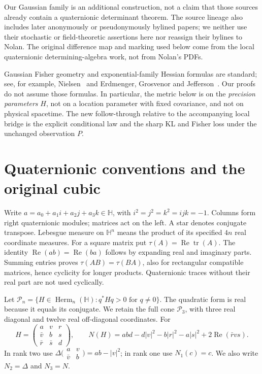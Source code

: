 \documentclass[11pt,a4paper]{article}
\numberwithin{equation}{section}
\theoremstyle{definition}
\theoremstyle{remark}
\newcommand{\HH}{\mathbb H}
\newcommand{\PP}{\mathcal P}
\newcommand{\Herm}{\operatorname{Herm}}
\newcommand{\Rea}{\operatorname{Re}}
\newcommand{\tr}{\operatorname{tr}}
\newcommand{\Ntwo}{\Delta}
\newcommand{\rtr}{\tau}
\begin{document}
Our Gaussian family is an additional construction, not a claim that those
sources already contain a quaternionic determinant theorem. The source
lineage also includes later anonymously or pseudonymously bylined papers;
we neither use their stochastic or field-theoretic assertions here nor
reassign their bylines to Nolan. The original difference map and marking
used below come from the local quaternionic determining-algebra work,
not from Nolan's PDFs.

Gaussian Fisher geometry and exponential-family Hessian formulas are
standard; see, for example, Nielsen~\cite[Section 2]{Nielsen2023Gaussian}
and Erdmenger, Grosvenor and Jefferson~\cite[Sections 2--2.2]{EGJ2020}.
Our proofs do not assume those formulas. In particular, the metric below is
on the \emph{precision parameters} $H$, not on a location parameter with fixed
covariance, and not on physical spacetime. The new follow-through relative
to the accompanying local bridge is the explicit conditional law and the
sharp KL and Fisher loss under the unchanged observation $P$.

\section{Quaternionic conventions and the original cubic}\label{sec:algebra}

Write $a=a_0+a_1i+a_2j+a_3k\in\HH$, with
$i^2=j^2=k^2=ijk=-1$. Columns form right quaternionic modules; matrices
act on the left. A star denotes conjugate transpose. Lebesgue measure
on $\HH^n$ means the product of its specified $4n$ real coordinate measures.
For a square matrix put $\rtr(A)=\Rea\tr(A)$.
The identity $\Rea(ab)=\Rea(ba)$ follows by expanding real and imaginary
parts. Summing entries proves $\rtr(AB)=\rtr(BA)$, also for rectangular
compatible matrices, hence cyclicity for longer products. Quaternionic
traces without their real part are not used cyclically.

Let $\PP_n=\{H\in\Herm_n(\HH):q^*Hq>0\text{ for }q\ne0\}$.
The quadratic form is real because it equals its conjugate. We retain
the full cone $\PP_3$, with three real diagonal and twelve real
off-diagonal coordinates. For
\begin{equation}\label{eq:cubic}
H=\begin{pmatrix}a&v&r\\\bar v&b&s\\\bar r&\bar s&d\end{pmatrix},
\qquad
N(H)=abd-d|v|^2-b|r|^2-a|s|^2+2\Rea(\bar r v s).
\end{equation}
In rank two use
$\Ntwo\bigl(\begin{smallmatrix}a&v\\\bar v&b\end{smallmatrix}\bigr)=ab-|v|^2$;
in rank one use $N_1(c)=c$. We also write $N_2=\Ntwo$ and $N_3=N$.
\end{document}
